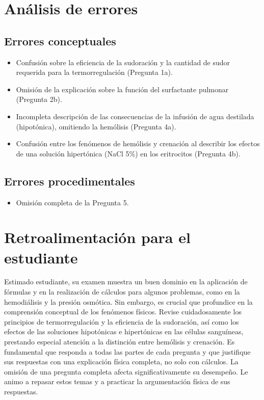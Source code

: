 \documentclass[11pt,a4paper]{article}
\begin{document}
\section*{Análisis de errores}

\subsection*{Errores conceptuales}
\begin{itemize}[leftmargin=1.5em, itemsep=2pt]
  \item Confusión sobre la eficiencia de la sudoración y la cantidad de sudor requerida para la termorregulación (Pregunta 1a).
  \item Omisión de la explicación sobre la función del surfactante pulmonar (Pregunta 2b).
  \item Incompleta descripción de las consecuencias de la infusión de agua destilada (hipotónica), omitiendo la hemólisis (Pregunta 4a).
  \item Confusión entre los fenómenos de hemólisis y crenación al describir los efectos de una solución hipertónica (NaCl 5\%) en los eritrocitos (Pregunta 4b).
\end{itemize}

\subsection*{Errores procedimentales}
\begin{itemize}[leftmargin=1.5em, itemsep=2pt]
  \item Omisión completa de la Pregunta 5.
\end{itemize}

\section*{Retroalimentación para el estudiante}
\begin{tcolorbox}[cajaRecomendacion, title={Dirigido a: Karla Rodriguez}]
Estimado estudiante, su examen muestra un buen dominio en la aplicación de fórmulas y en la realización de cálculos para algunos problemas, como en la hemodiálisis y la presión osmótica. Sin embargo, es crucial que profundice en la comprensión conceptual de los fenómenos físicos. Revise cuidadosamente los principios de termorregulación y la eficiencia de la sudoración, así como los efectos de las soluciones hipotónicas e hipertónicas en las células sanguíneas, prestando especial atención a la distinción entre hemólisis y crenación. Es fundamental que responda a todas las partes de cada pregunta y que justifique sus respuestas con una explicación física completa, no solo con cálculos. La omisión de una pregunta completa afecta significativamente su desempeño. Le animo a repasar estos temas y a practicar la argumentación física de sus respuestas.
\end{tcolorbox}
\end{document}
